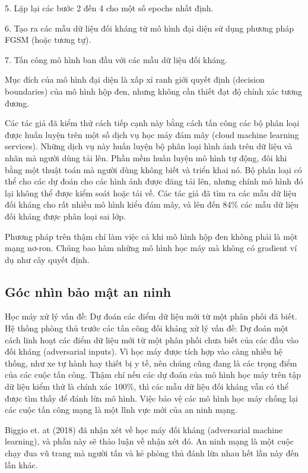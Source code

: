 5. Lặp lại các bước 2 đến 4 cho một số epochs nhất định.

6. Tạo ra các mẫu dữ liệu đối kháng từ mô hình đại diện sử dụng phương pháp FGSM (hoặc tương tự).

7. Tấn công mô hình ban đầu với các mẫu dữ liệu đối kháng.

Mục đích của mô hình đại diện là xấp xỉ ranh giới quyết định (decision boundaries) của mô hình hộp đen, nhưng không cần thiết đạt độ chính xác tương đương.

Các tác giả đã kiểm thử cách tiếp cạnh này bằng cách tấn công các bộ phân loại được huấn luyện trên một số dịch vụ học máy đám mây (cloud machine learning services). Những dịch vụ này huấn luyện bộ phân loại hình ảnh trên dữ liệu và nhãn mà người dùng tải lên. Phần mềm huấn luyện mô hình tự động, đôi khi bằng một thuật toán mà người dùng không biết và triển khai nó. Bộ phân loại có thể cho các dự đoán cho các hình ảnh được đăng tải lên, nhưng chính mô hình đó lại không thể được kiểm soát hoặc tải về. Các tác giả đã tìm ra các mẫu dữ liệu đối kháng cho rất nhiều mô hình kiểu đám mây, và lên đến 84\% các mẫu dữ liệu đối kháng được phân loại sai lớp.

Phương pháp trên thậm chí làm việc cả khi mô hình hộp đen không phải là một mạng nơ-ron. Chúng bao hàm những mô hình học máy mà không có gradient ví dụ như cây quyết định.

\subsection{Góc nhìn bảo mật an ninh}

Học máy xử lý vấn đề: Dự đoán các điểm dữ liệu mới từ một phân phối đã biết. Hệ thống phòng thủ trước các tấn công đối kháng xử lý vấn đề: Dự đoán một cách linh hoạt các điểm dữ liệu mới từ một phân phối chưa biết của các đầu vào đối kháng (adversarial inputs). Vì học máy được tích hợp vào càng nhiều hệ thống, như xe tự hành hay thiết bị y tế, nên chúng cũng đang là các trọng điểm của các cuộc tấn công. Thậm chí nếu các dự đoán của mô hình học máy trên tập dữ liệu kiểm thử là chính xác 100\%, thì các mẫu dữ liệu đối kháng vẫn có thể được tìm thấy để đánh lừa mô hình. Việc bảo vệ các mô hình học máy chống lại các cuộc tấn công mạng là một lĩnh vực mới của an ninh mạng.

Biggio et. at (2018) đã nhận xét về học máy đối kháng (adversarial machine learning), và phần này sẽ thảo luận về nhận xét đó. An ninh mạng là một cuộc chạy đua vũ trang mà người tấn và kẻ phòng thủ đánh lừa nhau hết lần này đến lần khác.


